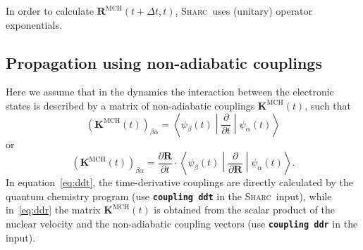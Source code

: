 \documentclass[a4paper,11pt,DIV=15,openany,twoside=false]{scrbook}
\newcommand{\sharc}{\textsc{Sharc}}
\newcommand{\ttt}[1]{\textbf{\texttt{#1}}}
\newcommand{\VEC}[1]{\ensuremath{\mathbf{#1}}}
\begin{document}
In order to calculate $\VEC{R}^{\text{MCH}}(t+\Delta t,t)$, \sharc\ uses (unitary) operator exponentials. 

\subsection{Propagation using non-adiabatic couplings}

Here we assume that in the dynamics the interaction between the electronic states is described by a matrix of non-adiabatic couplings $\VEC{K}^{\text{MCH}}(t)$, such that
\begin{equation}
  \left(\VEC{K}^{\text{MCH}}(t)\right)_{\beta\alpha}
  =
  \left\langle
    \psi_\beta(t)
  \middle|
    \frac{\partial}{\partial t}
  \middle|
    \psi_\alpha(t)
  \right\rangle
  \label{eq:ddt}
\end{equation}
or
\begin{equation}
  \left(\VEC{K}^{\text{MCH}}(t)\right)_{\beta\alpha}
  =
  \frac{\partial \VEC{R}}{\partial t}\cdot
  \left\langle
    \psi_\beta(t)
  \middle|
    \frac{\partial}{\partial \VEC{R}}
  \middle|
    \psi_\alpha(t)
  \right\rangle.
  \label{eq:ddr}
\end{equation}
In equation~\eqref{eq:ddt}, the time-derivative couplings are directly calculated by the quantum chemistry program (use \ttt{coupling ddt} in the \sharc\ input), while in~\eqref{eq:ddr} the matrix $\VEC{K}^{\text{MCH}}(t)$ is obtained from the scalar product of the nuclear velocity and the non-adiabatic coupling vectors (use \ttt{coupling ddr} in the input).
\end{document}
